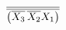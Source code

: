 \documentclass[preview]{standalone}
\begin{document}
\begin{align*}
\overline{\overline{\left(\overline{X_3}\nobreak\hspace{.16667em plus .08333em}\overline{X_2}X_1\right)}}
\end{align*}
\end{document}

